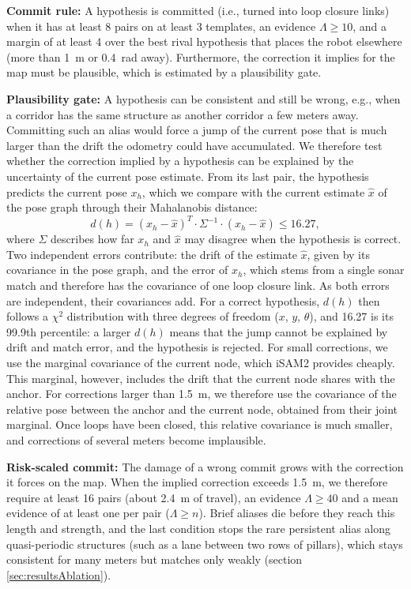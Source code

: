 \textbf{Commit rule:} A hypothesis is committed (i.e., turned into loop closure links) when it has at least 8 pairs on at least 3 templates, an evidence $\Lambda \ge 10$, and a margin of at least 4 over the best rival hypothesis that places the robot elsewhere (more than \SI{1}{\meter} or \SI{0.4}{\radian} away). Furthermore, the correction it implies for the map must be plausible, which is estimated by a plausibility gate.

\textbf{Plausibility gate:} A hypothesis can be consistent and still be wrong, e.g., when a corridor has the same structure as another corridor a few meters away. Committing such an alias would force a jump of the current pose that is much larger than the drift the odometry could have accumulated. We therefore test whether the correction implied by a hypothesis can be explained by the uncertainty of the current pose estimate. From its last pair, the hypothesis predicts the current pose $x_h$, which we compare with the current estimate $\hat{x}$ of the pose graph through their Mahalanobis distance:
\begin{equation}
d(h) = (x_h - \hat{x})^T \cdot \Sigma^{-1} \cdot (x_h - \hat{x}) \le 16.27,
\label{eq:plausibility}
\end{equation}
%
where $\Sigma$ describes how far $x_h$ and $\hat{x}$ may disagree when the hypothesis is correct. Two independent errors contribute: the drift of the estimate $\hat{x}$, given by its covariance in the pose graph, and the error of $x_h$, which stems from a single sonar match and therefore has the covariance of one loop closure link. As both errors are independent, their covariances add. For a correct hypothesis, $d(h)$ then follows a $\chi^2$ distribution with three degrees of freedom ($x$, $y$, $\theta$), and 16.27 is its 99.9th percentile: a larger $d(h)$ means that the jump cannot be explained by drift and match error, and the hypothesis is rejected. For small corrections, we use the marginal covariance of the current node, which iSAM2 provides cheaply. This marginal, however, includes the drift that the current node shares with the anchor. For corrections larger than \SI{1.5}{\meter}, we therefore use the covariance of the relative pose between the anchor and the current node, obtained from their joint marginal. Once loops have been closed, this relative covariance is much smaller, and corrections of several meters become implausible.

\textbf{Risk-scaled commit:} The damage of a wrong commit grows with the correction it forces on the map. When the implied correction exceeds \SI{1.5}{\meter}, we therefore require at least 16 pairs (about \SI{2.4}{\meter} of travel), an evidence $\Lambda \ge 40$ and a mean evidence of at least one per pair ($\Lambda \ge n$). Brief aliases die before they reach this length and strength, and the last condition stops the rare persistent alias along quasi-periodic structures (such as a lane between two rows of pillars), which stays consistent for many meters but matches only weakly (section \ref{sec:resultsAblation}).

